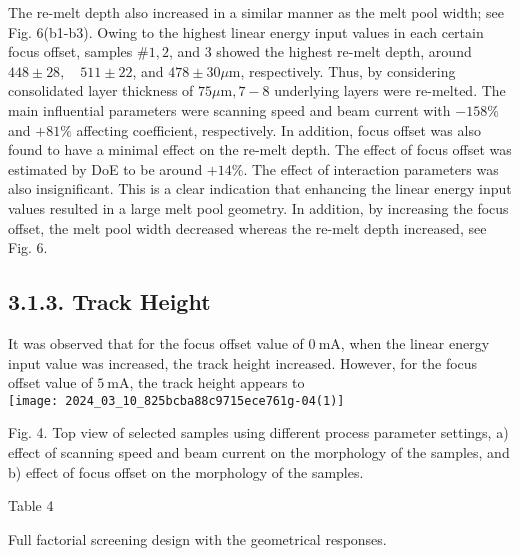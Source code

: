 \documentclass[10pt]{article}
\begin{document}
The re-melt depth also increased in a similar manner as the melt pool width; see Fig. 6(b1-b3). Owing to the highest linear energy input values in each certain focus offset, samples $\# 1,2$, and 3 showed the highest re-melt depth, around $448 \pm 28, \quad 511 \pm 22$, and $478 \pm 30 \mu \mathrm{m}$, respectively. Thus, by considering consolidated layer thickness of $75 \mu \mathrm{m}, 7-8$ underlying layers were re-melted. The main influential parameters were scanning speed and beam current with $-158 \%$ and $+81 \%$ affecting coefficient, respectively. In addition, focus offset was also found to have a minimal effect on the re-melt depth. The effect of focus offset was estimated by DoE to be around $+14 \%$. The effect of interaction parameters was also insignificant. This is a clear indication that enhancing the linear energy input values resulted in a large melt pool geometry. In addition, by increasing the focus offset, the melt pool width decreased whereas the re-melt depth increased, see Fig. 6.

\subsection*{3.1.3. Track Height}
It was observed that for the focus offset value of $0 \mathrm{~mA}$, when the linear energy input value was increased, the track height increased. However, for the focus offset value of $5 \mathrm{~mA}$, the track height appears to\\
\texttt{[image: 2024\_03\_10\_825bcba88c9715ece761g-04(1)]}

Fig. 4. Top view of selected samples using different process parameter settings, a) effect of scanning speed and beam current on the morphology of the samples, and b) effect of focus offset on the morphology of the samples.

Table 4

Full factorial screening design with the geometrical responses.
\end{document}
